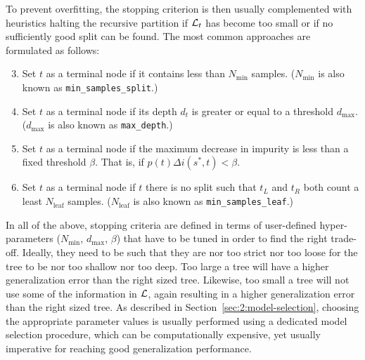 To prevent overfitting, the stopping criterion is then usually complemented
with heuristics halting the recursive partition if ${\cal L}_t$ has become too
small or if no sufficiently good split can be found. The most common approaches
are formulated as follows:

\begin{enumerate}\setcounter{enumi}{2}

\item Set $t$ as a terminal node if it contains less than $N_\text{min}$ samples.
($N_\text{min}$ is also known as \texttt{min\_samples\_split}.)

\item Set $t$ as a terminal node if its depth $d_t$ is greater or equal to a threshold $d_\text{max}$.
($d_\text{max}$ is also known as \texttt{max\_depth}.)

\item Set $t$ as a terminal node if the maximum decrease in impurity is less than
a fixed threshold $\beta$. That is, if $p(t) \Delta i(s^*, t) < \beta$.

\item Set $t$ as a terminal node if $t$ there is no split such that $t_L$ and
$t_R$ both count a least $N_\text{leaf}$ samples. ($N_\text{leaf}$ is also
known as \texttt{min\_samples\_leaf}.)

\end{enumerate}

In all of the above, stopping criteria are defined in terms of user-defined
hyper-parameters ($N_\text{min}$, $d_\text{max}$, $\beta$) that have to be
tuned in order to find the right trade-off. Ideally, they need to
be such that they are nor too strict nor too loose for the tree to be nor too
shallow nor too deep. Too large a tree will have a higher generalization error
than the right sized tree. Likewise, too small a tree will not use some of the
information in ${\cal L}$, again resulting in a higher generalization error
than the right sized tree. As described in Section~\ref{sec:2:model-selection},
choosing the appropriate parameter values is usually performed using a dedicated
model selection procedure, which can be computationally expensive, yet usually
imperative for reaching good generalization performance.

